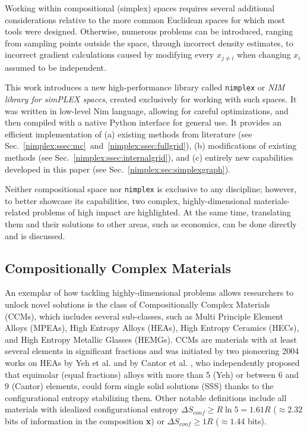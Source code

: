 Working within compositional (simplex) spaces requires several additional considerations relative to the more common Euclidean spaces for which most tools were designed. Otherwise, numerous problems can be introduced, ranging from sampling points outside the space, through incorrect density estimates, to incorrect gradient calculations caused by modifying every $x_{j\neq i}$ when changing $x_i$ assumed to be independent.

This work introduces a new high-performance library called \texttt{nimplex} or \textit{NIM library for simPLEX spaces}, created exclusively for working with such spaces. It was written in low-level Nim language, allowing for careful optimizations, and then compiled with a native Python interface for general use. It provides an efficient implementation of (a) existing methods from literature (see Sec.~\ref{nimplex:ssec:mc}~and~\ref{nimplex:ssec:fullgrid}), (b) modifications of existing methods (see Sec.~\ref{nimplex:ssec:internalgrid}), and (c) entirely new capabilities developed in this paper (see Sec.~\ref{nimplex:sec:simplexgraph}).

Neither compositional space nor \texttt{nimplex} is exclusive to any discipline; however, to better showcase its capabilities, two complex, highly-dimensional materials-related problems of high impact are highlighted. At the same time, translating them and their solutions to other areas, such as economics, can be done directly and is discussed.


\subsection{Compositionally Complex Materials} \label{nimplex:ssec:compositionallycomplex}

An exemplar of how tackling highly-dimensional problems allows researchers to unlock novel solutions is the class of Compositionally Complex Materials (CCMs), which includes several sub-classes, such as Multi Principle Element Alloys (MPEAs), High Entropy Alloys (HEAs), High Entropy Ceramics (HECs), and High Entropy Metallic Glasses (HEMGs). CCMs are materials with at least several elements in significant fractions and was initiated by two pioneering 2004 works on HEAs by Yeh et al. \cite{Yeh2004NanostructuredOutcomes} and by Cantor et al. \cite{Cantor2004MicrostructuralAlloys}, who independently proposed that equimolar (equal fractions) alloys with more than 5 (Yeh) or between 6 and 9 (Cantor) elements, could form single solid solutions (SSS) thanks to the configurational entropy stabilizing them. Other notable definitions include all materials with idealized configurational entropy $\Delta S_{conf}  \geq R \ln{5} = 1.61R$ \cite{Li2019MechanicalAlloys} ($\approx2.32$ bits of information in the composition \textbf{x}) or $\Delta S_{conf}  \geq 1R$  \cite{Senkov2019HighAlloys} ($\approx1.44$ bits).

